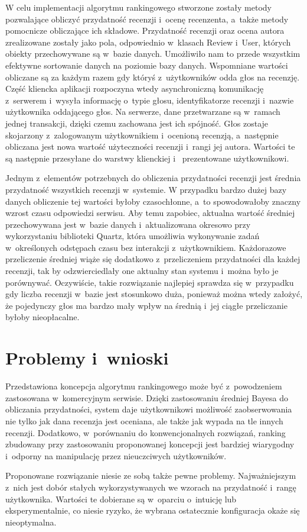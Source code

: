 W celu implementacji algorytmu rankingowego stworzone zostały metody pozwalające obliczyć przydatność recenzji i~ocenę recenzenta, a~także metody pomocnicze obliczające ich składowe. Przydatność recenzji oraz ocena autora zrealizowane zostały jako pola, odpowiednio w~klasach Review i~User, których obiekty przechowywane są w~bazie danych. Umożliwiło nam to przede wszystkim efektywne sortowanie danych na poziomie bazy danych. Wspomniane wartości obliczane są za każdym razem gdy któryś z~użytkowników odda głos na recenzję. Część kliencka aplikacji rozpoczyna wtedy asynchroniczną komunikację z~serwerem i~wysyła informację o~typie głosu, identyfikatorze recenzji i~nazwie użytkownika oddającego głos. Na serwerze, dane przetwarzane są w~ramach jednej transakcji\cite{springAction}, dzięki czemu zachowana jest ich spójność. Głos zostaje skojarzony z~zalogowanym użytkownikiem i~ocenioną recenzją, a~następnie obliczana jest nowa wartość użyteczności recenzji i~rangi jej autora. Wartości te są następnie przesyłane do warstwy klienckiej i~ prezentowane użytkownikowi.

Jednym z~elementów potrzebnych do obliczenia przydatności recenzji jest średnia przydatność wszystkich recenzji w~systemie. W przypadku bardzo dużej bazy danych obliczenie tej wartości byłoby czasochłonne, a~to spowodowałoby znaczny wzrost czasu odpowiedzi serwisu. Aby temu zapobiec, aktualna wartość średniej przechowywana jest w~bazie danych i~aktualizowana okresowo przy wykorzystaniu biblioteki Quartz, która umożliwia wykonywanie zadań w~określonych odstępach czasu bez interakcji z~użytkownikiem.\cite{quartz} Każdorazowe przeliczenie średniej wiąże się dodatkowo z~przeliczeniem przydatności dla każdej recenzji, tak by odzwierciedlały one aktualny stan systemu i~można było je porównywać. Oczywiście, takie rozwiązanie najlepiej sprawdza się w~przypadku gdy liczba  recenzji w~bazie jest stosunkowo duża, ponieważ można wtedy założyć, że pojedynczy głos ma bardzo mały wpływ na średnią i~jej ciągłe przeliczanie byłoby nieopłacalne.

\section{Problemy i~wnioski}

Przedstawiona koncepcja algorytmu rankingowego może być z~powodzeniem zastosowana w~komercyjnym serwisie. Dzięki zastosowaniu średniej Bayesa do obliczania przydatności, system daje użytkownikowi możliwość zaobserwowania nie tylko jak dana recenzja jest oceniana, ale także jak wypada na tle innych recenzji. Dodatkowo, w~porównaniu do konwencjonalnych rozwiązań, ranking zbudowany przy zastosowaniu proponowanej koncepcji jest bardziej wiarygodny i~odporny na manipulację przez nieuczciwych użytkowników.

Proponowane rozwiązanie niesie ze sobą także pewne problemy. Najważniejszym z~nich jest dobór stałych wykorzystywanych we wzorach na przydatność i~rangę użytkownika. Wartości te dobierane są w~oparciu o~intuicję lub eksperymentalnie, co niesie ryzyko, że wybrana ostatecznie konfiguracja okaże się nieoptymalna.
